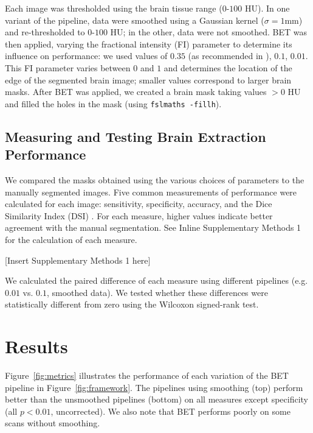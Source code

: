 \documentclass{elsarticle}\usepackage[]{graphicx}\usepackage[]{color}
\begin{document}
Each image was thresholded using the brain tissue range ($0$-$100$ HU).  In one variant of the pipeline, data were smoothed using a Gaussian kernel ($\sigma=1$mm) and re-thresholded to $0$-$100$ HU; in the other, data were not smoothed.  BET was then applied, varying the fractional intensity (FI) parameter to determine its influence on performance: we used values of $0.35$ (as recommended in \citet{rorden_age-specific_2012}), $0.1$, $0.01$.  This FI parameter varies between $0$ and $1$ and determines the location of the edge of the segmented brain image; smaller values correspond to larger brain masks. After BET was applied, we created a brain mask taking values $> 0$ HU and filled the holes in the mask (using \verb|fslmaths -fillh|).  



\subsection{Measuring and Testing Brain Extraction Performance}
We compared the masks obtained using the various choices of parameters to the manually segmented images.  Five common measurements of performance were calculated for each image: sensitivity, specificity, accuracy, and the Dice Similarity Index (DSI) \citep{dice_measures_1945}.  For each measure, higher values indicate better agreement with the manual segmentation.  See Inline Supplementary Methods 1 for the calculation of each measure.

[Insert Supplementary Methods 1 here]

We calculated the paired difference of each measure using different pipelines (e.g. $0.01$ vs. $0.1$, smoothed data).  We tested whether these differences were statistically different from zero using the Wilcoxon signed-rank test.






\section{Results}
Figure~\ref{fig:metrics}\protect{} illustrates the performance of each variation of the BET pipeline in Figure~\ref{fig:framework}.  The pipelines using smoothing (top) perform better than the unsmoothed pipelines (bottom) on all measures except specificity (all $p < 0.01$, uncorrected).  We also note that BET performs poorly on some scans without smoothing.  
\end{document}
